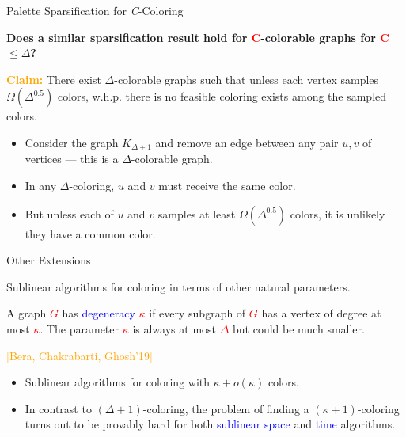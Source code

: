 \documentclass[aspectratio=169,xcolor=dvipsnames]{beamer}
\begin{document}
	\begin{frame}{Palette Sparsification for \textit{C}-Coloring}
		
		\textbf{Does a similar sparsification result hold for \textcolor{red}{C}-colorable graphs for \textcolor{red}{C} $\leq \Delta$?}
		
		\vspace{1em}
		
		\textbf{\textcolor{orange}{Claim:}} There exist $\Delta$-colorable graphs such that unless each vertex samples $\Omega(\Delta^{0.5})$ colors, w.h.p. there is no feasible coloring exists among the sampled colors.
		
		\vspace{1em}
		
		\begin{itemize}
			\item Consider the graph $K_{\Delta+1}$ and remove an edge between any pair $u, v$ of vertices — this is a $\Delta$-colorable graph.
			\item In any $\Delta$-coloring, $u$ and $v$ must receive the same color.
			\item But unless each of $u$ and $v$ samples at least $\Omega(\Delta^{0.5})$ colors, it is unlikely they have a common color.
		\end{itemize}
		
	\end{frame}
	
	\begin{frame}{Other Extensions}
		
		Sublinear algorithms for coloring in terms of other natural parameters.
		
		\vspace{1em}
		
		A graph \textcolor{red}{$G$} has \textcolor{blue}{degeneracy} \textcolor{red}{$\kappa$} if every subgraph of \textcolor{red}{$G$} has a vertex of degree at most \textcolor{red}{$\kappa$}. The parameter \textcolor{red}{$\kappa$} is always at most \textcolor{red}{$\Delta$} but could be much smaller.
		
		\vspace{1em}
		
		\textcolor{orange}{[Bera, Chakrabarti, Ghosh’19]}
		\begin{itemize}
			\item Sublinear algorithms for coloring with \(\kappa + o(\kappa)\) colors.
			\item In contrast to \((\Delta+1)\)-coloring, the problem of finding a \((\kappa+1)\)-coloring turns out to be provably hard for both \textcolor{blue}{sublinear space} and \textcolor{blue}{time} algorithms.
		\end{itemize}
		
	\end{frame}
	
\end{document}
